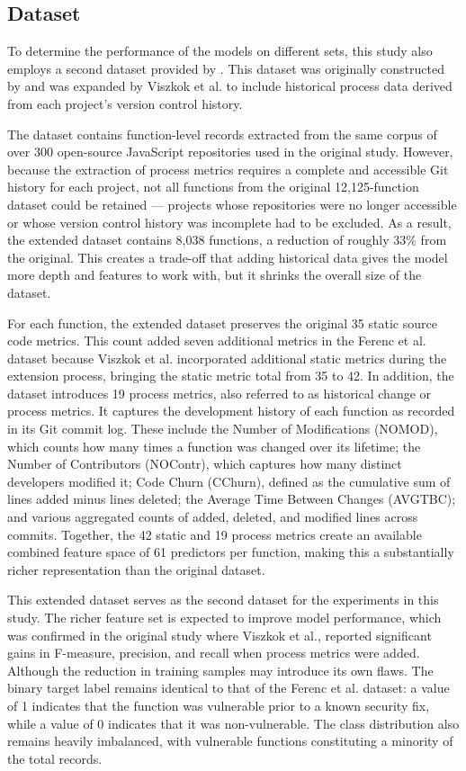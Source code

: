 \subsection{\citet{viszkok_improving_2021} Dataset}

To determine the performance of the models on different sets, this study also employs a second dataset provided by \citet{viszkok_improving_2021}. This dataset was originally constructed by \citet{ferenc_challenging_2019} and was expanded by Viszkok et al. to include historical process data derived from each project's version control history.

The dataset contains function-level records extracted from the same corpus of over 300 open-source JavaScript repositories used in the original study. However, because the extraction of process metrics requires a complete and accessible Git history for each project, not all functions from the original 12,125-function dataset could be retained — projects whose repositories were no longer accessible or whose version control history was incomplete had to be excluded. As a result, the extended dataset contains 8,038 functions, a reduction of roughly 33\% from the original. This creates a trade-off that adding historical data gives the model more depth and features to work with, but it shrinks the overall size of the dataset. 

For each function, the extended dataset preserves the original 35 static source code metrics. This count added seven additional metrics in the Ferenc et al. dataset because Viszkok et al. incorporated additional static metrics during the extension process, bringing the static metric total from 35 to 42. In addition, the dataset introduces 19 process metrics, also referred to as historical change or process metrics. It captures the development history of each function as recorded in its Git commit log. These include the Number of Modifications (NOMOD), which counts how many times a function was changed over its lifetime; the Number of Contributors (NOContr), which captures how many distinct developers modified it; Code Churn (CChurn), defined as the cumulative sum of lines added minus lines deleted; the Average Time Between Changes (AVGTBC); and various aggregated counts of added, deleted, and modified lines across commits. Together, the 42 static and 19 process metrics create an available combined feature space of 61 predictors per function, making this a substantially richer representation than the original dataset.

This extended dataset serves as the second dataset for the experiments in this study. The richer feature set is expected to improve model performance, which was confirmed in the original study where Viszkok et al., reported significant gains in F-measure, precision, and recall when process metrics were added. Although the reduction in training samples may introduce its own flaws. The binary target label remains identical to that of the Ferenc et al. dataset: a value of 1 indicates that the function was vulnerable prior to a known security fix, while a value of 0 indicates that it was non-vulnerable. The class distribution also remains heavily imbalanced, with vulnerable functions constituting a minority of the total records.

